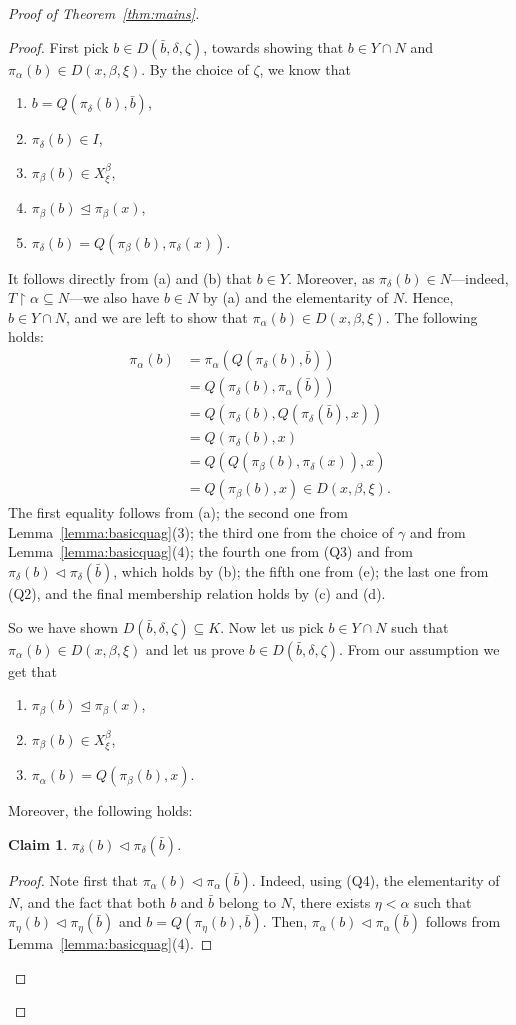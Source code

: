 \documentclass[]{amsart}
\newtheorem{subclaim}{Claim}[claim]
\theoremstyle{definition}
\theoremstyle{remark}
\begin{document}
\begin{proof}[Proof of Theorem~\ref{thm:mains}]
\begin{proof}
First pick $b \in D(\bar{b}, \delta, \zeta)$, towards showing that $b \in Y \cap N$ and $\pi_\alpha(b) \in D(x, \beta, \xi)$. By the choice of $\zeta$, we know that
\begin{enumerate}[label=(\alph*)]
\item $b = Q(\pi_\delta(b), \bar{b})$,
\item $\pi_\delta(b) \in I$,
\item $\pi_\beta(b) \in X^\beta_\xi$,
\item $\pi_\beta(b) \trianglelefteq \pi_\beta(x)$,
\item $\pi_\delta(b) = Q(\pi_\beta(b), \pi_\delta(x))$.
\end{enumerate}
It follows directly from (a) and (b) that $b \in Y$. Moreover, as $\pi_\delta(b) \in N$---indeed, $T \upharpoonright \alpha \subseteq N$---we also have $b \in N$ by (a) and the elementarity of $N$. Hence, $b \in Y \cap N$, and we are left to show that $\pi_\alpha(b) \in D(x, \beta, \xi)$. The following holds:
\begin{align*}
\pi_\alpha(b) &= \pi_\alpha(Q(\pi_\delta(b), \bar{b}))\\&= Q(\pi_\delta(b), \pi_\alpha(\bar{b}))\\&= Q(\pi_\delta(b), Q(\pi_\delta(\bar{b}), x)) \\&= Q(\pi_\delta(b), x) \\&= Q(Q(\pi_\beta(b), \pi_\delta(x)), x) \\&= Q(\pi_\beta(b), x) \in D(x, \beta, \xi).
\end{align*} 
The first equality follows from (a); the second one from Lemma~\ref{lemma:basicquag}(3); the third one from the choice of $\gamma$ and from Lemma~\ref{lemma:basicquag}(4); the fourth one from (Q3) and from $\pi_\delta(b) \lhd \pi_\delta(\bar{b})$, which holds by (b); the fifth one from (e); the last one from (Q2), and the final membership relation holds by (c) and (d).

So we have shown $D(\bar{b}, \delta, \zeta) \subseteq K$. Now let us pick $b \in Y \cap N$ such that $\pi_\alpha(b) \in D(x, \beta, \xi)$ and let us prove $b \in D(\bar{b}, \delta, \zeta)$. From our assumption we get that 
\begin{enumerate}[label=(\roman*)]
\item $\pi_\beta(b) \trianglelefteq \pi_\beta(x)$,
\item $\pi_\beta(b) \in X^\beta_\xi$,
\item $\pi_\alpha(b) = Q(\pi_\beta(b), x)$.
\end{enumerate}
Moreover, the following holds:
\begin{subclaim}\label{claim:5-1}
$\pi_\delta(b) \lhd \pi_\delta(\bar{b})$.
\end{subclaim}
\begin{proof}
Note first that $\pi_\alpha(b) \lhd \pi_\alpha(\bar{b})$. Indeed, using (Q4), the elementarity of $N$, and the fact that both $b$ and $\bar{b}$ belong to $N$, there exists $\eta < \alpha$ such that $\pi_\eta(b) \lhd \pi_\eta(\bar{b})$ and $b = Q(\pi_\eta(b), \bar{b})$. Then, $\pi_\alpha(b) \lhd \pi_\alpha(\bar{b})$ follows from Lemma~\ref{lemma:basicquag}(4). 


\end{proof}
\end{proof}
\end{proof}
\end{document}
